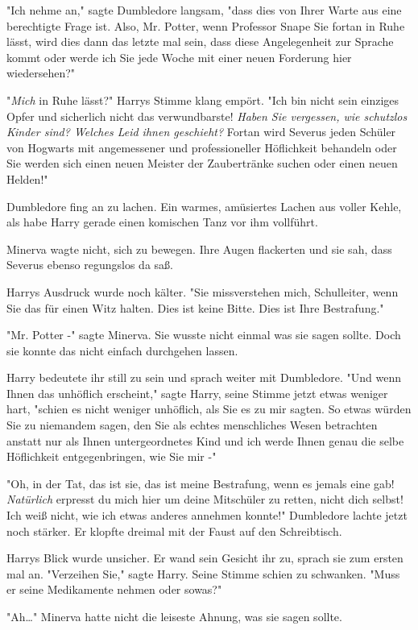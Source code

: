 {"Ich nehme an," sagte Dumbledore langsam, "dass dies von Ihrer Warte aus eine berechtigte Frage ist. Also, Mr. Potter, wenn Professor Snape Sie fortan in Ruhe lässt, wird dies dann das letzte mal sein, dass diese Angelegenheit zur Sprache kommt oder werde ich Sie jede Woche mit einer neuen Forderung hier wiedersehen?"

"\emph{Mich} in Ruhe lässt?" Harrys Stimme klang empört. "Ich bin nicht sein einziges Opfer und sicherlich nicht das verwundbarste! \emph{Haben Sie vergessen, wie schutzlos Kinder sind? Welches Leid ihnen geschieht?} Fortan wird Severus jeden Schüler von Hogwarts mit angemessener und professioneller Höflichkeit behandeln oder Sie werden sich einen neuen Meister der Zaubertränke suchen oder einen neuen Helden!"

Dumbledore fing an zu lachen. Ein warmes, amüsiertes Lachen aus voller Kehle, als habe Harry gerade einen komischen Tanz vor ihm vollführt.

Minerva wagte nicht, sich zu bewegen. Ihre Augen flackerten und sie sah, dass Severus ebenso regungslos da saß.

Harrys Ausdruck wurde noch kälter. "Sie missverstehen mich, Schulleiter, wenn Sie das für einen Witz halten. Dies ist keine Bitte. Dies ist Ihre Bestrafung."

"Mr. Potter -" sagte Minerva. Sie wusste nicht einmal was sie sagen sollte. Doch sie konnte das nicht einfach durchgehen lassen.

Harry bedeutete ihr still zu sein und sprach weiter mit Dumbledore. "Und wenn Ihnen das unhöflich erscheint," sagte Harry, seine Stimme jetzt etwas weniger hart, "schien es nicht weniger unhöflich, als Sie es zu mir sagten. So etwas würden Sie zu niemandem sagen, den Sie als echtes menschliches Wesen betrachten anstatt nur als Ihnen untergeordnetes Kind und ich werde Ihnen genau die selbe Höflichkeit entgegenbringen, wie Sie mir -"

"Oh, in der Tat, das ist sie, das ist meine Bestrafung, wenn es jemals eine gab! \emph{Natürlich} erpresst du mich hier um deine Mitschüler zu retten, nicht dich selbst! Ich weiß nicht, wie ich etwas anderes annehmen konnte!" Dumbledore lachte jetzt noch stärker. Er klopfte dreimal mit der Faust auf den Schreibtisch.

Harrys Blick wurde unsicher. Er wand sein Gesicht ihr zu, sprach sie zum ersten mal an. "Verzeihen Sie," sagte Harry. Seine Stimme schien zu schwanken. "Muss er seine Medikamente nehmen oder sowas?"

"Ah…" Minerva hatte nicht die leiseste Ahnung, was sie sagen sollte.

}
